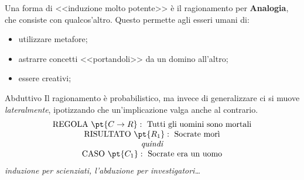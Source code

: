 \emptyln{}
Una forma di <<induzione molto potente>> è il ragionamento per \textbf{Analogia}, che consiste con qualcos'altro.
Questo permette agli esseri umani di:
\begin{itemize}
    \item utilizzare metafore;
    \item astrarre concetti <<portandoli>> da un domino all'altro;
    \item essere creativi;
\end{itemize}
\begin{definition}{Abduttivo}{}
    Il ragionamento è probabilistico, ma invece di generalizzare ci si muove \textit{lateralmente}, ipotizzando che un'implicazione valga anche al contrario.
\[
    \begin{matrix}
        \text{REGOLA } \pt{C \to R}: \text{ Tutti gli uomini sono mortali} \\
        \text{RISULTATO } \pt{R_1}: \text{ Socrate morì} \\
        \textit{quindi} \\
        \text{CASO } \pt{C_1}: \text{ Socrate era un uomo} \\
    \end{matrix}
\]
\textit{induzione per scienziati, l'abduzione per investigatori\ldots}
\end{definition}
%
